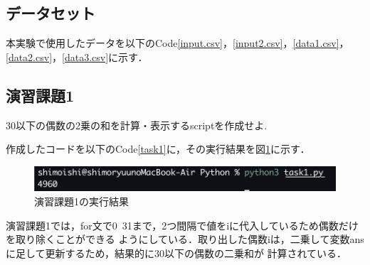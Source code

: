 \documentclass[a4paper,11pt]{jsarticle}
\begin{document}
\subsection{データセット}
  本実験で使用したデータを以下のCode\ref{input.csv}，\ref{input2.csv}，\ref{data1.csv}，\ref{data2.csv}，\ref{data3.csv}に示す．
  
  
  
  
  

\subsection{演習課題1}
  \begin{screen}
  30以下の偶数の2乗の和を計算・表示するscriptを作成せよ.
  \end{screen}
  作成したコードを以下のCode\ref{task1}に，その実行結果を図\ref{task1ans}に示す．
  
  \begin{figure}[H]
    \centering 
    \includegraphics[width=0.8\linewidth]{Experiment_photo/task1.png}
    \caption{演習課題1の実行結果}
    \label{task1ans}
  \end{figure}
  演習課題1では，for文で0~31まで，2つ間隔で値をiに代入しているため偶数だけを取り除くことができる
  ようにしている．取り出した偶数iは，二乗して変数ansに足して更新するため，結果的に30以下の偶数の二乗和が
  計算されている．
\end{document}
